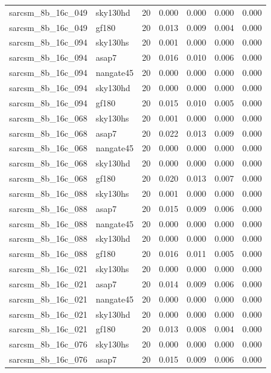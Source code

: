 \begin{tabular}{llrrrrr}
sarcsm\_8b\_16c\_049 & sky130hd & 20 & 0.000 & 0.000 & 0.000 & 0.000 \\
sarcsm\_8b\_16c\_049 & gf180 & 20 & 0.013 & 0.009 & 0.004 & 0.000 \\
sarcsm\_8b\_16c\_094 & sky130hs & 20 & 0.001 & 0.000 & 0.000 & 0.000 \\
sarcsm\_8b\_16c\_094 & asap7 & 20 & 0.016 & 0.010 & 0.006 & 0.000 \\
sarcsm\_8b\_16c\_094 & nangate45 & 20 & 0.000 & 0.000 & 0.000 & 0.000 \\
sarcsm\_8b\_16c\_094 & sky130hd & 20 & 0.000 & 0.000 & 0.000 & 0.000 \\
sarcsm\_8b\_16c\_094 & gf180 & 20 & 0.015 & 0.010 & 0.005 & 0.000 \\
sarcsm\_8b\_16c\_068 & sky130hs & 20 & 0.001 & 0.000 & 0.000 & 0.000 \\
sarcsm\_8b\_16c\_068 & asap7 & 20 & 0.022 & 0.013 & 0.009 & 0.000 \\
sarcsm\_8b\_16c\_068 & nangate45 & 20 & 0.000 & 0.000 & 0.000 & 0.000 \\
sarcsm\_8b\_16c\_068 & sky130hd & 20 & 0.000 & 0.000 & 0.000 & 0.000 \\
sarcsm\_8b\_16c\_068 & gf180 & 20 & 0.020 & 0.013 & 0.007 & 0.000 \\
sarcsm\_8b\_16c\_088 & sky130hs & 20 & 0.001 & 0.000 & 0.000 & 0.000 \\
sarcsm\_8b\_16c\_088 & asap7 & 20 & 0.015 & 0.009 & 0.006 & 0.000 \\
sarcsm\_8b\_16c\_088 & nangate45 & 20 & 0.000 & 0.000 & 0.000 & 0.000 \\
sarcsm\_8b\_16c\_088 & sky130hd & 20 & 0.000 & 0.000 & 0.000 & 0.000 \\
sarcsm\_8b\_16c\_088 & gf180 & 20 & 0.016 & 0.011 & 0.005 & 0.000 \\
sarcsm\_8b\_16c\_021 & sky130hs & 20 & 0.000 & 0.000 & 0.000 & 0.000 \\
sarcsm\_8b\_16c\_021 & asap7 & 20 & 0.014 & 0.009 & 0.006 & 0.000 \\
sarcsm\_8b\_16c\_021 & nangate45 & 20 & 0.000 & 0.000 & 0.000 & 0.000 \\
sarcsm\_8b\_16c\_021 & sky130hd & 20 & 0.000 & 0.000 & 0.000 & 0.000 \\
sarcsm\_8b\_16c\_021 & gf180 & 20 & 0.013 & 0.008 & 0.004 & 0.000 \\
sarcsm\_8b\_16c\_076 & sky130hs & 20 & 0.000 & 0.000 & 0.000 & 0.000 \\
sarcsm\_8b\_16c\_076 & asap7 & 20 & 0.015 & 0.009 & 0.006 & 0.000 \\

\end{tabular}
